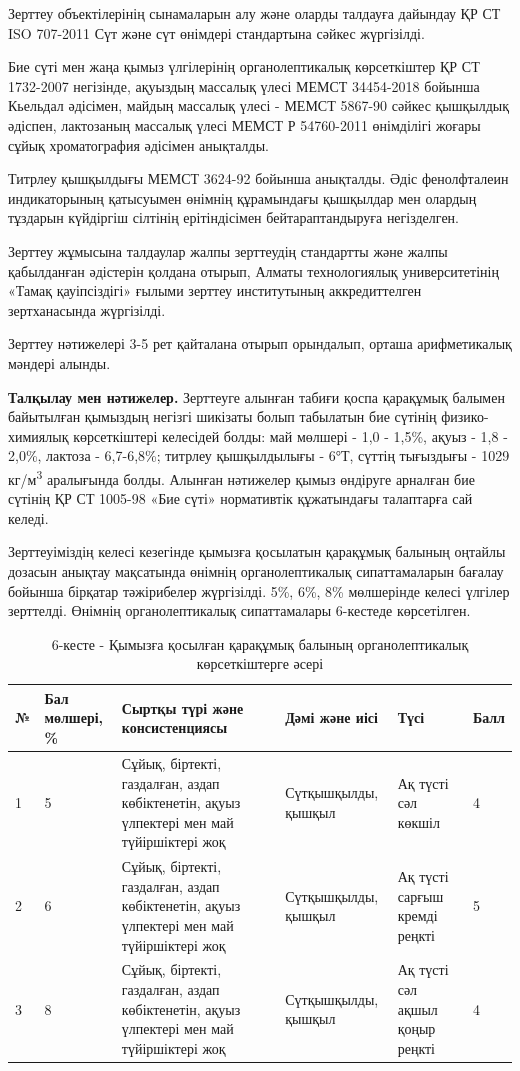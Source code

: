 \begin{multicols}{2}
Зерттеу объектілерінің сынамаларын алу және оларды талдауға дайындау ҚР
СТ ISO 707-2011 Сүт және сүт өнімдері стандартына сәйкес жүргізілді.

Бие сүті мен жаңа қымыз үлгілерінің органолептикалық көрсеткіштер ҚР СТ
1732-2007 негізінде, ақуыздың массалық үлесі МЕМСТ 34454-2018 бойынша
Кьельдал әдісімен, майдың массалық үлесі - МЕМСТ 5867-90 сәйкес
қышқылдық әдіспен, лактозаның массалық үлесі МЕМСТ Р 54760-2011
өнімділігі жоғары сұйық хроматография әдісімен анықталды.

Титрлеу қышқылдығы МЕМСТ 3624-92 бойынша анықталды. Әдіс фенолфталеин
индикаторының қатысуымен өнімнің құрамындағы қышқылдар мен олардың
тұздарын күйдіргіш сілтінің ерітіндісімен бейтараптандыруға негізделген.

Зерттеу жұмысына талдаулар жалпы зерттеудің стандартты және жалпы
қабылданған әдістерін қолдана отырып, Алматы технологиялық
университетінің «Тамақ қауіпсіздігі» ғылыми зерттеу институтының
аккредиттелген зертханасында жүргізілді.

Зерттеу нәтижелері 3-5 рет қайталана отырып орындалып, орташа
арифметикалық мәндері алынды.

{\bfseries Талқылау мен нәтижелер.} Зерттеуге алынған табиғи қоспа
қарақұмық балымен байытылған қымыздың негізгі шикізаты болып табылатын
бие сүтінің физико-химиялық көрсеткіштері келесідей болды: май мөлшері -
1,0 - 1,5\%, ақуыз - 1,8 - 2,0\%, лактоза - 6,7-6,8\%; титрлеу
қышқылдылығы - 6°Т, сүттің тығыздығы - 1029 кг/м\textsuperscript{3}
аралығында болды. Алынған нәтижелер қымыз өндіруге арналған бие сүтінің
ҚР СТ 1005-98 «Бие сүті» нормативтік құжатындағы талаптарға сай келеді.

Зерттеуіміздің келесі кезегінде қымызға қосылатын қарақұмық балының
оңтайлы дозасын анықтау мақсатында өнімнің органолептикалық
сипаттамаларын бағалау бойынша бірқатар тәжірибелер жүргізілді. 5\%,
6\%, 8\% мөлшерінде келесі үлгілер зерттелді. Өнімнің органолептикалық
сипаттамалары 6-кестеде көрсетілген.
\end{multicols}

\begin{table}[H]
\caption*{6-кесте - Қымызға қосылған қарақұмық балының органолептикалық көрсеткіштерге әсері}
\centering
\begin{tabular}{|l|p{}|p{}|p{}|p{}|l|}
\hline
№ & Бал мөлшері, \% & Сыртқы түрі және консистенциясы & Дәмі және иісі & Түсі & Балл \\ \hline
1 & 5 & Сұйық, біртекті, газдалған, аздап көбіктенетін, ақуыз үлпектері мен май түйіршіктері жоқ & Сүтқышқылды, қышқыл & Ақ түсті сәл көкшіл & 4 \\ \hline
2 & 6 & Сұйық, біртекті, газдалған, аздап көбіктенетін, ақуыз үлпектері мен май түйіршіктері жоқ & Сүтқышқылды, қышқыл & Ақ түсті сарғыш кремді реңкті & 5 \\ \hline
3 & 8 & Сұйық, біртекті, газдалған, аздап көбіктенетін, ақуыз үлпектері мен май түйіршіктері жоқ & Сүтқышқылды, қышқыл & Ақ түсті сәл ақшыл қоңыр реңкті & 4 \\ \hline
\end{tabular}
\end{table}

